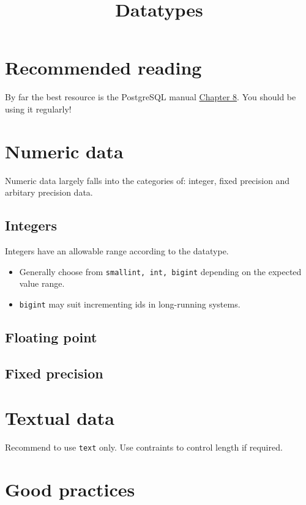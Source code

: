 \documentclass[slides]{pgnotes}
\title{Datatypes}
\begin{document}
\maketitle

\section*{Recommended reading}

By far the best resource is the PostgreSQL manual \href{https://www.postgresql.org/docs/current/datatype.html}{Chapter 8}.
You should be using it regularly!

\section{Numeric data}

Numeric data largely falls into the categories of: integer, fixed precision and arbitary precision data.

\subsection{Integers}

Integers have an allowable range according to the datatype.
\begin{itemize}
\item Generally choose from \texttt{smallint, int, bigint} depending on the expected value range. 
\item \texttt{bigint} may suit incrementing ids in long-running systems.
\end{itemize}

\subsection{Floating point}

\subsection{Fixed precision}

\section{Textual data}

Recommend to use \texttt{text} only.
Use contraints to control length if required. 

\section{Good practices}
\end{document}

